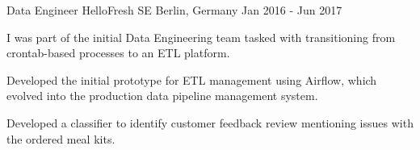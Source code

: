 \begin{cventries}


\begin{comment}
  \cventry
    {Lead NLP Engineer} %
    {Comtravo GmbH} %
    {Berlin, Germany} %
    {Aug 2017 - Apr 2022} %
	{
      \begin{cvitems} %
		\item {Joined as an NLP Engineer in August 2017, was promoted to Senior NLP Engineer in July 2019, and in June 2021 to Lead NLP Engineer.}
        \item {Led a team of 3 developers + 4 annotators, working on the system that automatically answers incoming email travel requests and assists travel agents in handling them. Coordinating development tasks based on system performance and feature requests.}
        \item {Trained, evaluated and improved different models for text classification and fine-grained NER, increasing the performance of identifying specific booking requests and performing information extraction to automatically fulfil booking requests.}
		\item {Developed algorithms to map input text into unique Knowledge Base identifiers, e.g: airports, train stations, hotels, geographic locations.}		
      \end{cvitems}
    }
\end{comment}


  \cventry
    {Data Engineer} %
    {HelloFresh SE} %
    {Berlin, Germany} %
    {Jan 2016 - Jun 2017} %
    {
      \begin{cvitems} %
        \item {I was part of the initial Data Engineering team tasked with transitioning from crontab-based processes to an ETL platform.}
        \item {Developed the initial prototype for ETL management using Airflow, which evolved into the production data pipeline management system.}
        \item {Developed a classifier to identify customer feedback review mentioning issues with the ordered meal kits.}
      \end{cvitems}
    }
	

\end{cventries}
